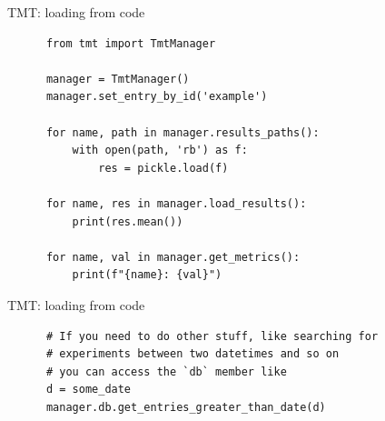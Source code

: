 \documentclass[aspectratio=169,xcolor={dvipsnames}]{beamer}
\begin{document}
  \begin{frame}[fragile]{TMT: loading from code}
    \begin{verbatim}
      from tmt import TmtManager

      manager = TmtManager()
      manager.set_entry_by_id('example')

      for name, path in manager.results_paths():
          with open(path, 'rb') as f:
              res = pickle.load(f)

      for name, res in manager.load_results():
          print(res.mean())

      for name, val in manager.get_metrics():
          print(f"{name}: {val}")
    \end{verbatim}
  \end{frame}
  \begin{frame}[fragile]{TMT: loading from code}
    \begin{verbatim}
      # If you need to do other stuff, like searching for
      # experiments between two datetimes and so on
      # you can access the `db` member like
      d = some_date
      manager.db.get_entries_greater_than_date(d)
    \end{verbatim}
  \end{frame}
\end{document}
